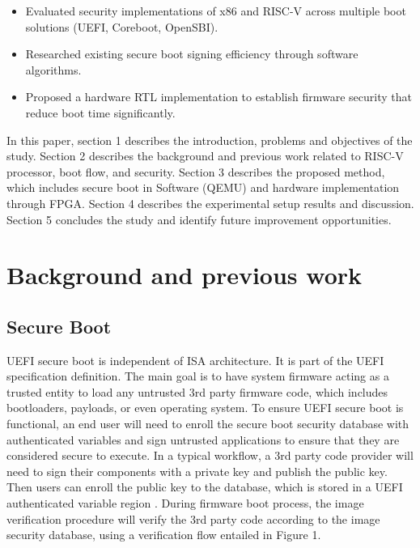 \documentclass[review]{elsarticle}
\begin{document}
 \begin{itemize}
  \item Evaluated security implementations of x86 and RISC-V across multiple boot solutions (UEFI, Coreboot, OpenSBI).
  \item Researched existing secure boot signing efficiency through software algorithms.
  \item Proposed a hardware RTL implementation to establish firmware security that reduce boot time significantly.
\end{itemize}

In this paper, section 1 describes the introduction, problems and objectives of the study.
Section 2 describes the background and previous work related to RISC-V processor, boot flow, and
security. Section 3 describes the proposed method, which includes secure boot in Software (QEMU)
and hardware implementation through FPGA. Section 4 describes the experimental setup results and
discussion. Section 5 concludes the study and identify future improvement opportunities.


\section{ Background and previous work}


\subsection{Secure Boot}
UEFI secure boot is independent of ISA architecture. It is part of the UEFI specification definition. The main goal is to have system firmware acting as a trusted entity to load any untrusted 3rd party firmware code, which includes bootloaders, payloads, or even operating system. To ensure UEFI secure boot is functional, an end user will need to enroll the secure boot security database with authenticated variables and sign untrusted applications to ensure that they are considered secure to execute.
In a typical workflow, a 3rd party code provider will need to sign their components with a private key and publish the public key. Then users can enroll the public key to the database, which is stored in a UEFI authenticated variable region \cite{R5:13}.  During firmware boot process, the image verification procedure will verify the 3rd party code according to the image security database, using a verification flow entailed in Figure 1.
\end{document}
